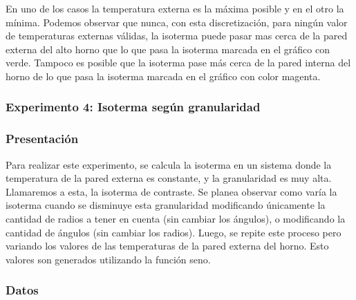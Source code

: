         En uno de los casos la temperatura externa es la máxima posible y en el otro la mínima. Podemos observar que nunca, con esta discretización, para ningún valor de temperaturas externas válidas, la isoterma puede pasar mas cerca de la pared externa del alto horno que lo que pasa la isoterma marcada en el gráfico con verde. Tampoco es posible que la isoterma pase más cerca de la pared interna del horno de lo que pasa la isoterma marcada en el gráfico con color magenta.

    \subsubsection{Experimento 4: Isoterma según granularidad} 
        
      \subsubsection*{Presentación}
        Para realizar este experimento, se calcula la isoterma en un sistema donde la temperatura de la pared externa es constante, y la granularidad es muy alta. Llamaremos a esta, la isoterma de contraste. Se planea observar como varía la isoterma cuando se disminuye esta granularidad modificando únicamente la cantidad de radios a tener en cuenta (sin cambiar los ángulos), o modificando la cantidad de ángulos (sin cambiar los radios).
        Luego, se repite este proceso pero variando los valores de las temperaturas de la pared externa del horno. Esto valores son generados utilizando la función seno.

      \subsubsection*{Datos}

